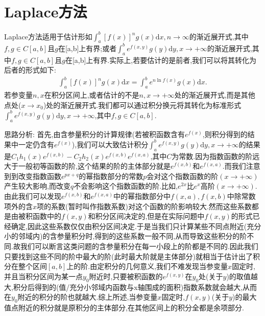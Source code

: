 \documentclass[../../main.tex]{subfiles}%
\begin{document}
\section{Laplace方法}

Laplace方法适用于估计形如$\int_a^b{\left[ f\left( x \right) \right] ^ng\left( x \right) \mathrm{d}x},n\rightarrow \infty $的渐近展开式,其中$f,g\in C[a,b]$且$g$在[a,b]上有界;或者$\int_a^b{e^{f\left( x,y \right)}g(y)\mathrm{d}y},x\rightarrow +\infty $的渐近展开式,其中$f,g\in C[a,b]$且$g$在[a,b]上有界.实际上,若要估计的是前者,我们可以将其转化为后者的形式如下:
\begin{align*}
\int_a^b{\left[ f\left( x \right) \right] ^ng\left( x \right) \mathrm{d}x}=\int_a^b{e^{n\ln f\left( x \right)}g\left( x \right) \mathrm{d}x}.
\end{align*}
若参变量$n,x$在积分区间上,或者估计的不是$n,x\to +\infty$处的渐近展开式,而是其他点处($x\to x_0$)处的渐近展开式.我们都可以通过积分换元将其转化为标准形式$\int_a^b{e^{f\left( x,y \right)}g(y)\mathrm{d}y},x\rightarrow +\infty $,其中$f,g\in C[a,b]$.

思路分析:
首先,由含参量积分的计算规律(若被积函数含有$e^{f(x)}$,则积分得到的结果中一定仍含有$e^{f(x)}$),我们可以大致估计积分$\int_a^b{e^{f\left( x,y \right)}g(y)\mathrm{d}y},x\rightarrow +\infty $的结果是$C_1h_1\left( x \right) e^{f\left( x,b \right)}-C_2h_2\left( x \right) e^{f\left( x,b \right)}e^{f\left( x,a \right)} $,其中$C$为常数.因为指数函数的阶远大于一般初等函数的阶,这个结果的阶的主体部分就是$e^{f\left( x,b \right)}$和$e^{f\left( x,a \right)}$.而我们注意到到改变指数函数$e^{px+q}$的幂指数部分的常数$p$会对这个指数函数的阶$(x\to +\infty)$产生较大影响,而改变$q$不会影响这个指数函数的阶.比如,$e^{2x}$比$e^x$高阶$(x\to+\infty)$.由此我们可以发现$e^{f\left( x,b \right)}$和$e^{f\left( x,a \right)}$中的幂指数部分中$f(x,a),f(x,b)$中除常数项外的含$x$项的系数(暂时叫作指数系数)对这个函数的阶影响较大.然而这些系数都是由被积函数中的$f(x,y)$和积分区间决定的,但是在实际问题中$f(x,y)$的形式已经确定,因此这些系数仅仅由积分区间决定.于是当我们只计算某些不同点附近(充分小的邻域内)的含参量积分时,得到的这些系数一般不同,从而导致这些积分的阶不同.故我们可以断言这类问题的含参量积分在每一小段上的阶都是不同的.因此我们只要找到这些不同的阶中最大的阶(此时最大阶就是主体部分)就相当于估计出了积分在整个区间$[a,b]$上的阶.由定积分的几何意义,我们不难发现当参变量$x$固定时,并且当积分区间为某一点$y_0$附近时,只要被积函数的$e^{f(x,y)}$在$y_0$处(关于$y$)的取值越大,积分后得到的(值/充分小邻域内函数与x轴围成的面积)指数系数就会越大,从而在$y_0$附近的积分的阶也就越大.综上所述,当参变量$x$固定时,$f(x,y)$(关于$y$)的最大值点附近的积分就是原积分的主体部分,在其他区间上的积分全都是余项部分.
\end{document}
